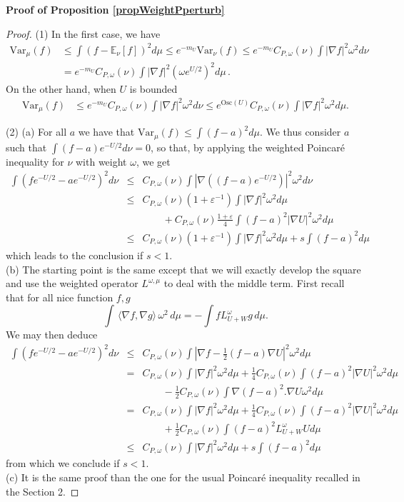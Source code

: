 \documentclass[11pt,reqno]{amsart}
\numberwithin{equation}{section}
\theoremstyle{definition}
\theoremstyle{remark}
\def \Var {\textrm{Var}}
\def \Osc {\textrm{Osc}}
\begin{document}
\noindent \textbf{Proof of Proposition \ref{propWeightPperturb}}
\begin{proof}
(1) In the first case, we have
    \begin{align*}
        \Var_\mu(f)&\leq \int(f-\mathbb{E}_\nu[f])^2 d\mu\leq e^{-m_U}\Var_\nu(f)\leq e^{-m_U}C_{P, \omega}(\nu)\int\vert\nabla f\vert^2\omega^2 d\nu \\&=e^{-m_U}C_{P, \omega}(\nu)\int\vert\nabla f\vert^2(\omega e^{U/2})^2 d\mu\, .
    \end{align*}
    On the other hand, when $U$ is bounded
        \begin{align*}
        \Var_\mu(f)&\leq e^{-m_U}C_{P, \omega}(\nu)\int\vert\nabla f\vert^2\omega^2 d\nu \leq e^{\Osc(U)}C_{P, \omega}(\nu)\int\vert\nabla f\vert^2\omega ^2 d\mu.
    \end{align*}
    
(2) (a) For all $a$ we have that $\Var_\mu(f)\le \int (f-a)^2d\mu$. We thus consider $a$ such that $\int (f-a)e^{-U/2}d\nu=0$, so that, by applying the weighted Poincar\'e inequality for $\nu$ with weight $\omega$, we get
\begin{eqnarray*}
    \int(fe^{-U/2}-ae^{-U/2})^2d\nu &\le&C_{P,\omega}(\nu) \int\left\vert\nabla \left((f-a)e^{-U/2}\right)\right\vert^2\omega^2d\nu\\
    &\le& C_{P,\omega}(\nu)(1+\varepsilon^{-1})\int|\nabla f|^2\omega^2d\mu\\&&\qquad + C_{P,\omega}(\nu)\frac{1+\varepsilon}{4}\int(f-a)^2|\nabla U|^2\omega^2d\mu\\
    &\le&C_{P,\omega}(\nu)(1+\varepsilon^{-1})\int|\nabla f|^2\omega^2d\mu+s\int(f-a)^2d\mu
\end{eqnarray*}
which leads to the conclusion if $s<1$.\\

(b) The starting point is the same except that we will exactly develop the square and use the weighted operator $L^{\omega, \mu}$ to deal with the middle term. First recall that for all nice function $f,g$
$$\int \, \langle\nabla f,\nabla g\rangle \, \omega^2 \, d\mu=-\int fL_{U+W}^{\omega}g\, d\mu.$$
We may then deduce
\begin{eqnarray*}
    \int(fe^{-U/2}-ae^{-U/2})^2d\nu &\le&C_{P,\omega}(\nu) \int|\nabla f- \frac12(f-a)\nabla U|^2\omega^2d\mu\\
    &=& C_{P,\omega}(\nu)\int|\nabla f|^2\omega^2d\mu+ \frac14C_{P,\omega}(\nu)\int(f-a)^2|\nabla U|^2\omega^2d\mu\\
    &&\qquad-\frac12C_{P,\omega}(\nu)\int \nabla (f-a)^2.\nabla U \omega^2d\mu\\
    &=&C_{P,\omega}(\nu)\int|\nabla f|^2\omega^2d\mu+ \frac14C_{P,\omega}(\nu)\int(f-a)^2|\nabla U|^2\omega^2d\mu\\
    &&\qquad+\frac12C_{P,\omega}(\nu)\int (f-a)^2 L_{U+W}^{\omega}U d\mu\\
    &\le& C_{P,\omega}(\nu)\int|\nabla f|^2\omega^2d\mu+s\int(f-a)^2d\mu
\end{eqnarray*}
from which we conclude if $s<1$.\\

(c) It is the same proof than the one for the usual Poincar\'e inequality recalled in the Section 2.
\end{proof}
\end{document}
